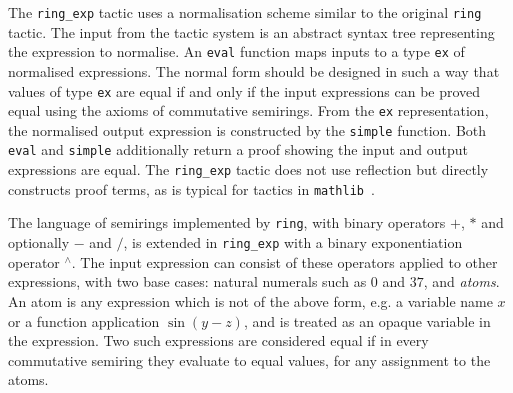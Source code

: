 \documentclass{llncs}
\newcommand{\lean}[1]{\texttt{#1}\xspace} %
\newcommand{\mathlib}{\texttt{mathlib}\xspace}
\newcommand{\pow}{{${}^\wedge$}\xspace}
\newcommand{\ring}{\lean{ring}}
\newcommand{\ringexp}{\lean{ring\_exp}}
\begin{document}
The \ringexp tactic uses a normalisation scheme similar to the original \ring tactic.
The input from the tactic system is an abstract syntax tree representing the expression to normalise.
An \lean{eval} function maps inputs to a type \lean{ex} of normalised expressions.
The normal form should be designed in such a way that values of type \lean{ex} are equal
if and only if the input expressions can be proved equal using the axioms of commutative semirings.
From the \lean{ex} representation, the normalised output expression is constructed by the \lean{simple} function.
Both \lean{eval} and \lean{simple} additionally return a proof showing the input and output expressions are equal.
The \ringexp tactic does not use reflection but directly constructs proof terms, as is typical for tactics in \mathlib~\cite{mathlib}.

The language of semirings implemented by \ring, with binary operators $+$, $*$ and optionally $-$ and $/$,
is extended in \ringexp with a binary exponentiation operator \pow.
The input expression can consist of these operators applied to other expressions,
with two base cases: natural numerals such as $0$ and $37$, and \emph{atoms}.
An atom is any expression which is not of the above form, e.g. a variable name $x$ or a function application $\sin (y - z)$,
and is treated as an opaque variable in the expression.
Two such expressions are considered equal if in every commutative semiring they evaluate to equal values, for any assignment to the atoms.

\end{document}
